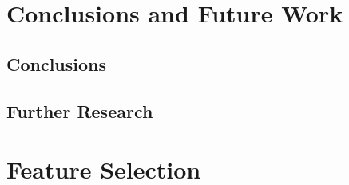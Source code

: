 \documentclass[11pt, a4paper, english]{book}
\begin{document}

\chapter{Conclusions and Future Work}

\section{Conclusions}



\section{Further Research}


\listoffigures
\listoftables

\newpage



\appendix
\chapter{Feature Selection}
\label{chap:feature_selection}

\end{document}
